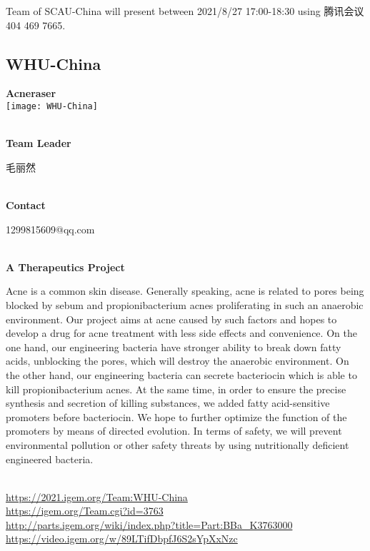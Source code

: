 \vfill{}









Team of SCAU-China will present between   2021/8/27 17:00-18:30      using 腾讯会议 404 469 7665.
\newpage


\subsection{\textcolor{Blu}{ WHU-China } }
\vspace{5mm}
\begin{center}
\large{
  \textbf{ Acneraser }\\
  \texttt{[image: WHU-China]}
}
\end{center}
\textbf{\\Team Leader}

  毛丽然


\textbf{\\Contact}

  1299815609@qq.com


\textbf{\\A Therapeutics Project\\}\begin{spacing}{1.5}

Acne is a common skin disease. Generally speaking, acne is related to pores being blocked by sebum and propionibacterium acnes proliferating in such an anaerobic environment. Our project aims at acne caused by such factors and hopes to develop a drug for acne treatment with less side effects and convenience. On the one hand, our engineering bacteria have stronger ability to break down fatty acids, unblocking the pores, which will destroy the anaerobic environment. On the other hand, our engineering bacteria can secrete bacteriocin which is able to kill propionibacterium acnes. At the same time, in order to ensure the precise synthesis and secretion of killing substances, we added fatty acid-sensitive promoters before bacteriocin. We hope to further optimize the function of the promoters by means of directed evolution. In terms of safety, we will prevent environmental pollution or other safety threats by using nutritionally deficient engineered bacteria.\end{spacing}
\\

\url{https://2021.igem.org/Team:WHU-China }\\
\url{https://igem.org/Team.cgi?id=3763 }\\
\url{http://parts.igem.org/wiki/index.php?title=Part:BBa_K3763000 }\\
\url{https://video.igem.org/w/89LTifDbpfJ6S2sYpXxNzc }\\

